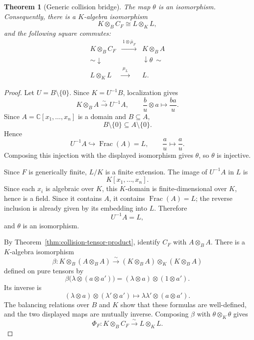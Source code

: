 \documentclass[11pt]{article}
\newtheorem{theorem}{Theorem}[section]
\theoremstyle{remark}
\theoremstyle{definition}
\DeclareMathOperator{\Frac}{Frac}
\newcommand{\C}{\mathbb C}
\begin{document}
\begin{theorem}[Generic collision bridge]
\label{thm:generic-collision-base-change}
The map \(\theta\) is an isomorphism.  Consequently, there is a
\(K\)-algebra isomorphism
\[
  K\otimes_BC_F
  \cong
  L\otimes_KL,
\]
and the following square commutes:
\[
  \begin{array}{ccc}
    K\otimes_BC_F
      &\xrightarrow{\ 1\otimes\bar\mu_F\ }&
    K\otimes_BA\\
    {\scriptstyle\sim}\downarrow
      &&\downarrow{\scriptstyle\theta\ \sim}\\
    L\otimes_KL
      &\xrightarrow{\ \mu_L\ }&
    L.
  \end{array}
\]
\end{theorem}

\begin{proof}
Let \(U=B\setminus\{0\}\).  Since \(K=U^{-1}B\), localization gives
\[
  K\otimes_BA
  \xrightarrow{\sim}
  U^{-1}A,
  \qquad
  \frac{b}{u}\otimes a\longmapsto\frac{ba}{u}.
\]
Since \(A=\C[x_1,\dots,x_n]\) is a domain and \(B\subseteq A\),
\[
  B\setminus\{0\}\subseteq A\setminus\{0\}.
\]
Hence
\[
  U^{-1}A\hookrightarrow\Frac(A)=L,
  \qquad
  \frac{a}{u}\longmapsto\frac{a}{u}.
\]
Composing this injection with the displayed isomorphism gives
\(\theta\), so \(\theta\) is injective.

Since \(F\) is generically finite, \(L/K\) is a finite extension.  The
image of \(U^{-1}A\) in \(L\) is
\[
  K[x_1,\dots,x_n].
\]
Since each \(x_i\) is algebraic over \(K\), this \(K\)-domain is
finite-dimensional over \(K\), hence is a field.  Since it contains
\(A\), it contains \(\Frac(A)=L\); the reverse inclusion is already
given by its embedding into \(L\).  Therefore
\[
  U^{-1}A=L,
\]
and \(\theta\) is an isomorphism.

By Theorem~\ref{thm:collision-tensor-product}, identify
\(C_F\) with \(A\otimes_BA\).  There is a \(K\)-algebra isomorphism
\[
  \beta\colon
  K\otimes_B(A\otimes_BA)
  \xrightarrow{\sim}
  (K\otimes_BA)\otimes_K(K\otimes_BA)
\]
defined on pure tensors by
\[
  \beta\bigl(\lambda\otimes(a\otimes a')\bigr)
  =
  (\lambda\otimes a)\otimes(1\otimes a').
\]
Its inverse is
\[
  (\lambda\otimes a)\otimes(\lambda'\otimes a')
  \longmapsto
  \lambda\lambda'\otimes(a\otimes a').
\]
The balancing relations over \(B\) and \(K\) show that these formulas
are well-defined, and the two displayed maps are mutually inverse.
Composing \(\beta\) with \(\theta\otimes_K\theta\) gives
\[
  \Phi_F\colon K\otimes_BC_F\xrightarrow{\sim}L\otimes_KL.
\]


\end{proof}
\end{document}
